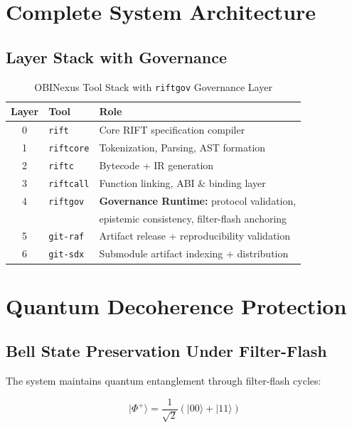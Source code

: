 \documentclass[11pt,a4paper]{article}
\begin{document}
\section{Complete System Architecture}

\subsection{Layer Stack with Governance}

\begin{table}[h]
\centering
\begin{tabular}{|c|l|l|}
\hline
\textbf{Layer} & \textbf{Tool} & \textbf{Role} \\
\hline
0 & \texttt{rift} & Core RIFT specification compiler \\
1 & \texttt{riftcore} & Tokenization, Parsing, AST formation \\
2 & \texttt{riftc} & Bytecode + IR generation \\
3 & \texttt{riftcall} & Function linking, ABI \& binding layer \\
4 & \texttt{riftgov} & \textbf{Governance Runtime:} protocol validation, \\
  &                & epistemic consistency, filter-flash anchoring \\
5 & \texttt{git-raf} & Artifact release + reproducibility validation \\
6 & \texttt{git-sdx} & Submodule artifact indexing + distribution \\
\hline
\end{tabular}
\caption{OBINexus Tool Stack with \texttt{riftgov} Governance Layer}
\end{table}

\section{Quantum Decoherence Protection}

\subsection{Bell State Preservation Under Filter-Flash}

The system maintains quantum entanglement through filter-flash cycles:

\begin{equation}
|\Phi^+\rangle = \frac{1}{\sqrt{2}}(|00\rangle + |11\rangle)
\end{equation}
\end{document}
